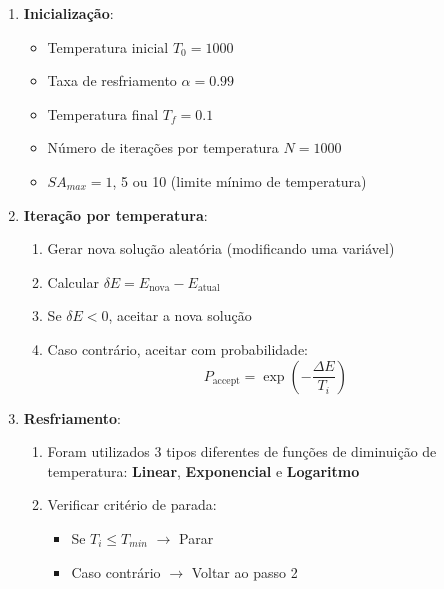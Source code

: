 \documentclass[12pt]{article}
\begin{document}
\begin{enumerate}
    \item \textbf{Inicialização}:
    \begin{itemize}
        \item Temperatura inicial $T_0 = 1000$
        \item Taxa de resfriamento $\alpha = 0.99$
        \item Temperatura final $T_f = 0.1$
        \item Número de iterações por temperatura $N = 1000$
        \item $SA_{max} = 1$, 5 ou 10 (limite mínimo de temperatura)
    \end{itemize}
    
    \item \textbf{Iteração por temperatura}:
    \begin{enumerate}
        \item Gerar nova solução aleatória (modificando uma variável)
        \item Calcular $\delta E = E_{\text{nova}} - E_{\text{atual}}$
        \item Se $\delta E < 0$, aceitar a nova solução
        \item Caso contrário, aceitar com probabilidade:
        \begin{equation}
            P_{\text{accept}} = \exp\left(-\frac{\Delta E}{T_i}\right)
            \label{eq:probabilidade}
        \end{equation}
    \end{enumerate}
    
    \item \textbf{Resfriamento}:
    \begin{enumerate}
      \item Foram utilizados 3 tipos diferentes de funções de diminuição de temperatura: \textbf{Linear}, \textbf{Exponencial} e \textbf{Logaritmo}
      \item Verificar critério de parada:
        \begin{itemize}
            \item Se $T_i \leq T_{min}$ $\rightarrow$ Parar
            \item Caso contrário $\rightarrow$ Voltar ao passo 2
        \end{itemize}
    \end{enumerate}
\end{enumerate}
\end{document}
